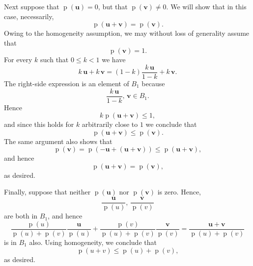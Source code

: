 \documentclass{article}
\newcommand{\bu}{\mathbf{u}}
\newcommand{\bv}{\mathbf{v}}
\newcommand{\pnorm}{\operatorname{p}}
\newcommand{\snorm}[1]{\pnorm(#1)}
\begin{document}
Next suppose that $\snorm{\bu}=0$, but that $\snorm{\bv}\neq 0$. We will show
that in this case, necessarily,
$$\snorm{\bu+\bv} = \snorm{\bv}.$$
Owing to the homogeneity assumption, we may without loss of generality
assume that
$$\snorm{\bv}=1.$$
For every $k$ such that $0\leq k<1$ we have
$$ k\,\bu+k\,\bv = (1-k) \frac{k\,\bu}{1-k} + k\,\bv.$$
The right-side expression is an element of $B_1$ because
$$\frac{k\,\bu}{1-k},\, \bv \in B_1.$$
Hence
$$k\snorm{\bu+\bv} \leq 1,$$
and since this holds for $k$ arbitrarily close to $1$ we conclude that
$$\snorm{\bu+\bv}\leq \snorm{\bv}.$$
The same argument also shows that
$$\snorm{\bv} = \snorm{-\bu+(\bu+\bv)} \leq \snorm{\bu+\bv},$$
and hence
$$\snorm{\bu+\bv}=\snorm{\bv},$$
as desired.

Finally, suppose that neither $\snorm{\bu}$ nor $\snorm{\bv}$ is zero. Hence,
$$\frac{\bu}{\snorm{u}},\, \frac{\bv}{\snorm{v}}$$
are both in $B_1$, and hence
$$\frac{\snorm{u}}{\snorm{u}+\snorm{v}} \frac{\bu}{\snorm{u}}+
\frac{\snorm{v}}{\snorm{u}+\snorm{v}} \frac{\bv}{\snorm{v}} =
\frac{\bu+\bv}{\snorm{u}+\snorm{v}} 
$$
is in $B_1$ also. Using homogeneity, we conclude that
$$\snorm{u+v}\leq \snorm{u}+\snorm{v},$$
as desired.
\end{document}
